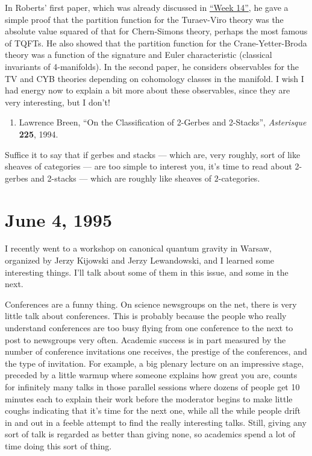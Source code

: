 \documentclass{article}
\def\tightlist{}
\begin{document}
In Roberts' first paper, which was already discussed in
\protect\hyperlink{week14}{``Week 14''}, he gave a simple proof that the
partition function for the Turaev-Viro theory was the absolute value
squared of that for Chern-Simons theory, perhaps the most famous of
TQFTs. He also showed that the partition function for the
Crane-Yetter-Broda theory was a function of the signature and Euler
characteristic (classical invariants of 4-manifolds). In the second
paper, he considers observables for the TV and CYB theories depending on
cohomology classes in the manifold. I wish I had energy now to explain a
bit more about these observables, since they are very interesting, but I
don't!

\begin{enumerate}
\def\labelenumi{\arabic{enumi})}
\setcounter{enumi}{5}
\tightlist
\item
  Lawrence Breen, ``On the Classification of 2-Gerbes and 2-Stacks'',
  \emph{Asterisque} \textbf{225}, 1994.
\end{enumerate}

Suffice it to say that if gerbes and stacks --- which are, very roughly,
sort of like sheaves of categories --- are too simple to interest you,
it's time to read about 2-gerbes and 2-stacks --- which are roughly like
sheaves of \(2\)-categories.



\hypertarget{week55}{%
\section{June 4, 1995}\label{week55}}

I recently went to a workshop on canonical quantum gravity in Warsaw,
organized by Jerzy Kijowski and Jerzy Lewandowski, and I learned some
interesting things. I'll talk about some of them in this issue, and some
in the next.

Conferences are a funny thing. On science newsgroups on the net, there
is very little talk about conferences. This is probably because the
people who really understand conferences are too busy flying from one
conference to the next to post to newsgroups very often. Academic
success is in part measured by the number of conference invitations one
receives, the prestige of the conferences, and the type of invitation.
For example, a big plenary lecture on an impressive stage, preceded by a
little warmup where someone explains how great you are, counts for
infinitely many talks in those parallel sessions where dozens of people
get 10 minutes each to explain their work before the moderator begins to
make little coughs indicating that it's time for the next one, while all
the while people drift in and out in a feeble attempt to find the really
interesting talks. Still, giving any sort of talk is regarded as better
than giving none, so academics spend a lot of time doing this sort of
thing.
\end{document}
